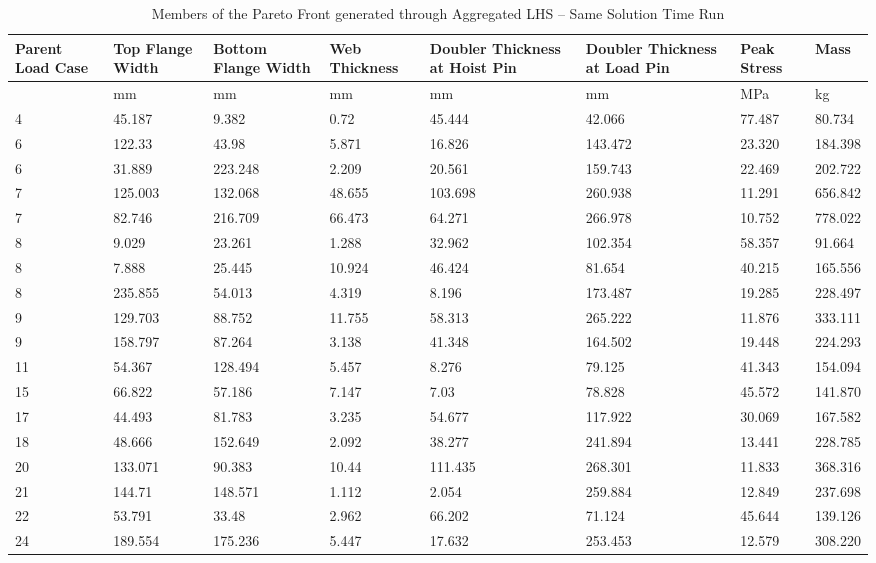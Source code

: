 \begin{table}[!htbp]
\small
\begin{tabular}{|p{1.5cm}p{1.5cm}p{1.5cm}p{1.4cm}p{2cm}p{2cm}p{1.5cm}p{1.5cm}|}
\hline
Parent Load Case&Top Flange Width&Bottom Flange Width&Web Thickness&Doubler Thickness at Hoist Pin&Doubler Thickness at Load Pin&Peak Stress& Mass\\
\hline
&mm&mm&mm&mm&mm&MPa&kg\\
\hline
4&45.187&9.382&0.72&45.444&42.066&77.487&80.734\\
6&122.33&43.98&5.871&16.826&143.472&23.320&184.398\\
6&31.889&223.248&2.209&20.561&159.743&22.469&202.722\\
7&125.003&132.068&48.655&103.698&260.938&11.291&656.842\\
7&82.746&216.709&66.473&64.271&266.978&10.752&778.022\\
8&9.029&23.261&1.288&32.962&102.354&58.357&91.664\\
8&7.888&25.445&10.924&46.424&81.654&40.215&165.556\\
8&235.855&54.013&4.319&8.196&173.487&19.285&228.497\\
9&129.703&88.752&11.755&58.313&265.222&11.876&333.111\\
9&158.797&87.264&3.138&41.348&164.502&19.448&224.293\\
11&54.367&128.494&5.457&8.276&79.125&41.343&154.094\\
15&66.822&57.186&7.147&7.03&78.828&45.572&141.870\\
17&44.493&81.783&3.235&54.677&117.922&30.069&167.582\\
18&48.666&152.649&2.092&38.277&241.894&13.441&228.785\\
20&133.071&90.383&10.44&111.435&268.301&11.833&368.316\\
21&144.71&148.571&1.112&2.054&259.884&12.849&237.698\\
22&53.791&33.48&2.962&66.202&71.124&45.644&139.126\\
24&189.554&175.236&5.447&17.632&253.453&12.579&308.220\\
\hline
\end{tabular}
\caption{Members of the Pareto Front generated through Aggregated LHS -- Same Solution Time Run}
\label{tab:pfront_agg_sametime}
\end{table}

